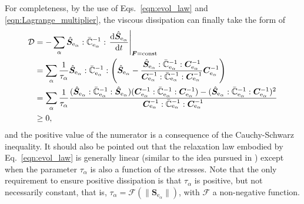For completeness, by the use of Eqs.~\eqref{eqn:evol_law} and \eqref{eqn:Lagrange_multiplier}, the viscous dissipation can finally take the form of
%
\begin{equation}
	\label{eq68}
	\begin{aligned}
		\mathcal{D} &= -\sum_{\alpha} \hat{\boldsymbol{S}}_{\mathrm{e}_{\alpha}} : \bar{\mathbb{C}}_{\mathrm{e}_{\alpha}}^{-1} : \left.\frac{\mathrm{d}\hat{\boldsymbol{S}}_{\mathrm{e}_{\alpha}} }{\mathrm{d}t} \right|_{\boldsymbol{F}=\text{const}} \\
		&=\sum_{\alpha} \frac{1}{\tau_\alpha} \hat{\boldsymbol{S}}_{\mathrm{e}_{\alpha}} : \bar{\mathbb{C}}_{\mathrm{e}_{\alpha}}^{-1} : \left( \hat{\boldsymbol{S}}_{\mathrm{e}_{\alpha}} - \frac{\hat{\boldsymbol{S}}_{\mathrm{e}_{\alpha}} : \bar{\mathbb{C}}^{-1}_{\mathrm{e}_{\alpha}} : \boldsymbol{C}_{\mathrm{e}_{\alpha}}^{-1}}{\boldsymbol{C}_{\mathrm{e}_{\alpha}}^{-1} : \bar{\mathbb{C}}^{-1}_{\mathrm{e}_{\alpha}} : \boldsymbol{C}_{\mathrm{e}_{\alpha}}^{-1}} \boldsymbol{C}_{\mathrm{e}_{\alpha}}^{-1} \right) \\
		& = \sum_{\alpha} \frac{1}{\tau_\alpha} \frac{ (\hat{\boldsymbol{S}}_{\mathrm{e}_{\alpha}} : \bar{\mathbb{C}}_{\mathrm{e}_{\alpha}}^{-1} : \hat{\boldsymbol{S}}_{\mathrm{e}_{\alpha}})(\boldsymbol{C}_{\mathrm{e}_{\alpha}}^{-1} : \bar{\mathbb{C}}^{-1}_{\mathrm{e}_{\alpha}} : \boldsymbol{C}_{\mathrm{e}_{\alpha}}^{-1}) - (\hat{\boldsymbol{S}}_{\mathrm{e}_{\alpha}} : \bar{\mathbb{C}}^{-1}_{\mathrm{e}_{\alpha}} : \boldsymbol{C}_{\mathrm{e}_{\alpha}}^{-1})^2 }{\boldsymbol{C}_{\mathrm{e}_{\alpha}}^{-1} : \bar{\mathbb{C}}^{-1}_{\mathrm{e}_{\alpha}} : \boldsymbol{C}_{\mathrm{e}_{\alpha}}^{-1}} \\
		&\geq 0,
	\end{aligned}
\end{equation}
%
and the positive value of the numerator is a consequence of the Cauchy-Schwarz inequality.
{
It should also be pointed out that the relaxation law embodied by Eq.~\eqref{eqn:evol_law} is generally linear (similar to the idea pursued in \cite{Simo1987viscodamage}) except when the parameter $\tau_{\alpha}$ is also a function of the stresses. Note that the only requirement to ensure positive dissipation is that $\tau_{\alpha}$ is positive, but not necessarily constant, that is, $\tau_{\alpha}=\mathcal{F}(\|\boldsymbol{S}_{\textrm{e}_{\alpha}}\|)$, with $\mathcal{F}$ a non-negative function.
}


